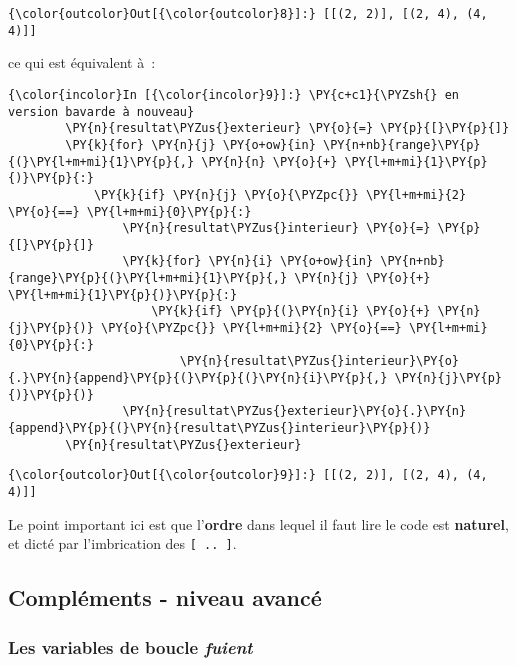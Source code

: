 \begin{Verbatim}[commandchars=\\\{\}]
{\color{outcolor}Out[{\color{outcolor}8}]:} [[(2, 2)], [(2, 4), (4, 4)]]
\end{Verbatim}
            
    ce qui est équivalent à~:

    \begin{Verbatim}[commandchars=\\\{\}]
{\color{incolor}In [{\color{incolor}9}]:} \PY{c+c1}{\PYZsh{} en version bavarde à nouveau}
        \PY{n}{resultat\PYZus{}exterieur} \PY{o}{=} \PY{p}{[}\PY{p}{]}
        \PY{k}{for} \PY{n}{j} \PY{o+ow}{in} \PY{n+nb}{range}\PY{p}{(}\PY{l+m+mi}{1}\PY{p}{,} \PY{n}{n} \PY{o}{+} \PY{l+m+mi}{1}\PY{p}{)}\PY{p}{:}
            \PY{k}{if} \PY{n}{j} \PY{o}{\PYZpc{}} \PY{l+m+mi}{2} \PY{o}{==} \PY{l+m+mi}{0}\PY{p}{:}
                \PY{n}{resultat\PYZus{}interieur} \PY{o}{=} \PY{p}{[}\PY{p}{]}
                \PY{k}{for} \PY{n}{i} \PY{o+ow}{in} \PY{n+nb}{range}\PY{p}{(}\PY{l+m+mi}{1}\PY{p}{,} \PY{n}{j} \PY{o}{+} \PY{l+m+mi}{1}\PY{p}{)}\PY{p}{:}
                    \PY{k}{if} \PY{p}{(}\PY{n}{i} \PY{o}{+} \PY{n}{j}\PY{p}{)} \PY{o}{\PYZpc{}} \PY{l+m+mi}{2} \PY{o}{==} \PY{l+m+mi}{0}\PY{p}{:}
                        \PY{n}{resultat\PYZus{}interieur}\PY{o}{.}\PY{n}{append}\PY{p}{(}\PY{p}{(}\PY{n}{i}\PY{p}{,} \PY{n}{j}\PY{p}{)}\PY{p}{)}
                \PY{n}{resultat\PYZus{}exterieur}\PY{o}{.}\PY{n}{append}\PY{p}{(}\PY{n}{resultat\PYZus{}interieur}\PY{p}{)}
        \PY{n}{resultat\PYZus{}exterieur}
\end{Verbatim}


\begin{Verbatim}[commandchars=\\\{\}]
{\color{outcolor}Out[{\color{outcolor}9}]:} [[(2, 2)], [(2, 4), (4, 4)]]
\end{Verbatim}
            
    Le point important ici est que l'\textbf{ordre} dans lequel il faut lire
le code est \textbf{naturel}, et dicté par l'imbrication des
\texttt{{[}\ ..\ {]}}.

    \hypertarget{compluxe9ments---niveau-avancuxe9}{%
\subsection{Compléments - niveau
avancé}\label{compluxe9ments---niveau-avancuxe9}}

    \hypertarget{les-variables-de-boucle-fuient}{%
\subsubsection{\texorpdfstring{Les variables de boucle
\emph{fuient}}{Les variables de boucle fuient}}\label{les-variables-de-boucle-fuient}}

